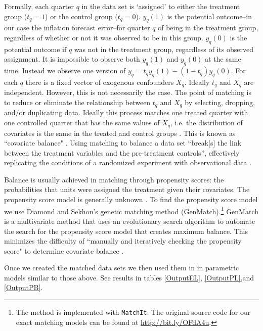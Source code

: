\documentclass[a4paper]{article}
\begin{document}
Formally, each quarter $q$ in the data set is `assigned' to either the treatment group ($t_{q} = 1$) or the control group ($t_{q} = 0$). $y_{q}(1)$ is the potential outcome--in our case the inflation forecast error--for quarter $q$ of being in the treatment group, regardless of whether or not it was observed to be in this group. $y_{q}(0)$ is the potential outcome if $q$ was not in the treatment group, regardless of its observed assignment. It is impossible to observe both $y_{q}(1)$ and $y_{q}(0)$ at the same time. Instead we observe one version of $y_{q}=t_{q}y_{q}(1)-(1-t_{q})y_q(0)$. For each $q$ there is a fixed vector of exogenous confounders $X_{q}$. Ideally $t_{q}$ and $X_{q}$ are independent. However, this is not necessarily the case. The point of matching is to reduce or eliminate the relationship between $t_{q}$  and $X_{q}$ by selecting, dropping, and/or duplicating data. Ideally this process matches one treated quarter with one controlled quarter that has the same values of $X_{q}$, i.e. the distribution of covariates is the same in the treated and control groups \citep{matchit2011}. This is known as ``covariate balance" \cite[1]{Diamond2012}. Using matching to balance a data set ``break[s] the link between the treatment variables and the pre-treatment controls'', effectively replicating the conditions of a randomized experiment with observational data \cite[][2--3]{matchit2011}. 

Balance is usually achieved in matching through propensity scores: the probabilities that units were assigned the treatment given their covariates. The propensity score model is generally unknown \citep{Drake1993}. To find the propensity score model we use Diamond and Sekhon's \citeyearpar{Diamond2012} genetic matching method (GenMatch).\footnote{The method is implemented with {\tt{MatchIt}}. The original source code for our exact matching models can be found at {\url{http://bit.ly/OFdA4u}}.} GenMatch is a multivariate method that uses an evolutionary search algorithm to automate the search for the propensity score model that creates maximum balance. This minimizes the difficulty of ``manually and iteratively checking the propensity score" to determine covariate balance \citep[][2]{Diamond2012}. 

Once we created the matched data sets we then used them in in parametric models similar to those above. See results in tables \ref{OutputEL}, \ref{OutputPL},and \ref{OutputPB}. 
\end{document}
